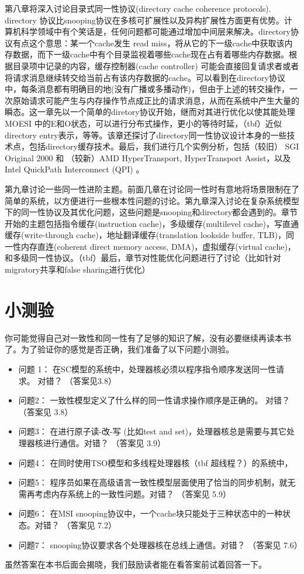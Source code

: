 \documentclass[UTF-8]{ctexrep}
\begin{document}
\par 第八章将深入讨论目录式同一性协议(directory cache coherence protocols). directory 协议比snooping协议在多核可扩展性以及异构扩展性方面更有优势。计算机科学领域中有个笑话是，任何问题都可能通过增加中间层来解决。directory协议有点这个意思：某一个cache发生 read miss，将从它的下一级cache中获取该内存数据，而下一级cache中有个目录监视着哪些cache现在占有着哪些内存数据。根据目录项中记录的内容，缓存控制器(cache controller) 可能会直接回复请求者或者将请求消息继续转交给当前占有该内存数据的cache。可以看到在directory协议中，每条消息都有明确目的地(没有广播或多播动作)，但由于上述的转交操作，一次原始请求可能产生与内存操作节点成正比的请求消息，从而在系统中产生大量的瞬态。这一章先以一个简单的diretory协议开始，继而对其进行优化以使其能处理MOESI 中的E和O状态，可以进行分布式操作，更小的等待时延，（tbf）近似directory entry表示，等等。该章还探讨了directory同一性协议设计本身的一些技术点，包括directory缓存技术。最后，我们进行几个实例分析，包括（较旧） SGI Original 2000 和 （较新）AMD HyperTransport, HyperTransport Assist，以及 Intel QuickPath Interconnect (QPI) 。
\par 第九章讨论一些同一性进阶主题。前面几章在讨论同一性时有意地将场景限制在了简单的系统，以方便进行一些根本性问题的讨论。第九章深入讨论在复杂系统模型下的同一性协议及其优化问题，这些问题是snooping和directory都会遇到的。章节开始的主题包括指令缓存(instruction cache)，多级缓存(multilevel cache)，写直通缓存(write-through cache)，地址翻译缓存(translation lookside buffer, TLB)，同一性内存直连(coherent direct memory access, DMA)，虚拟缓存(virtual cache)，和多级同一性协议。（tbf）最后，章节对性能优化问题进行了讨论（比如针对migratory共享和false sharing进行优化）
\section {小测验}
你可能觉得自己对一致性和同一性有了足够的知识了解，没有必要继续再读本书了。为了验证你的感觉是否正确，我们准备了以下问题小测验。
\begin{itemize}
\item 问题 1： 在SC模型的系统中，处理器核必须以程序指令顺序发送同一性请求。 对错？ （答案见3.8）
\item 问题2： 一致性模型定义了什么样的同一性请求操作顺序是正确的。 对错？ （答案见 3.8）
\item 问题3： 在进行原子读-改-写 (比如test and set)，处理器核总是需要与其它处理器核进行通信。对错？ （答案见 3.9）
\item 问题4： 在同时使用TSO模型和多线程处理器核（tbf  超线程？）的系统中，
\item 问题5： 程序员如果在高级语言一致性模型层面使用了恰当的同步机制，就无需再考虑内存系统上的一致性问题。对错？ （答案见 5.9）
\item 问题6： 在MSI snooping协议中，一个cache块只能处于三种状态中的一种状态。对错？ （答案见 7.2）
\item 问题7： snooping协议要求各个处理器核在总线上通信。对错？ （答案见 7.6）
\end{itemize}
\par 虽然答案在本书后面会揭晓，我们鼓励读者能在看答案前试着回答一下。
\end{document}
